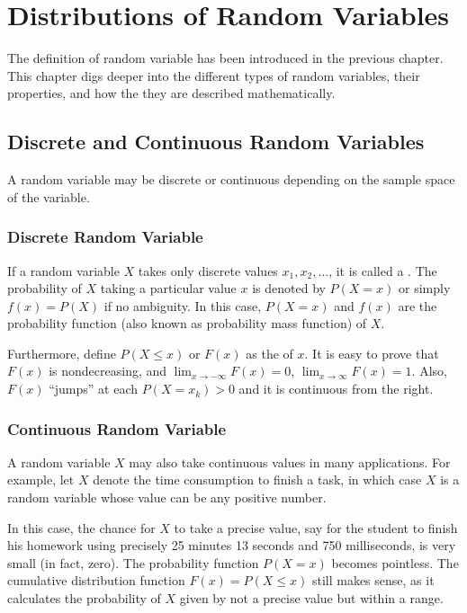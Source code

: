 \chapter{Distributions of Random Variables} \label{ch:rv}

The definition of random variable has been introduced in the previous chapter. This chapter digs deeper into the different types of random variables, their properties, and how the they are described mathematically.

\section{Discrete and Continuous Random Variables}

A random variable may be discrete or continuous depending on the sample space of the variable.

\subsection{Discrete Random Variable}

If a random variable $X$ takes only discrete values $x_1, x_2, ...$, it is called a .
The probability of $X$ taking a particular value $x$ is denoted by $P(X=x)$ or simply $f(x)=P(X)$ if no ambiguity. In this case, $P(X=x)$ and $f(x)$ are the probability function (also known as probability mass function) of $X$.

Furthermore, define $P(X\leq x)$ or $F(x)$ as the  of $x$. It is easy to prove that $F(x)$ is nondecreasing, and $\lim_{x\rightarrow -\infty}F(x)=0$, $\lim_{x\rightarrow \infty}F(x)=1$. Also, $F(x)$ ``jumps'' at each $P(X=x_k)>0$ and it is continuous from the right.

\subsection{Continuous Random Variable}

A random variable $X$ may also take continuous values in many applications. For example, let $X$ denote the time consumption to finish a task, in which case $X$ is a random variable whose value can be any positive number.

In this case, the chance for $X$ to take a precise value, say for the student to finish his homework using precisely 25 minutes 13 seconds and 750 milliseconds, is very small (in fact, zero). The probability function $P(X=x)$ becomes pointless. The cumulative distribution function $F(x) = P(X\leq x)$ still makes sense, as it calculates the probability of $X$ given by not a precise value but within a range.


